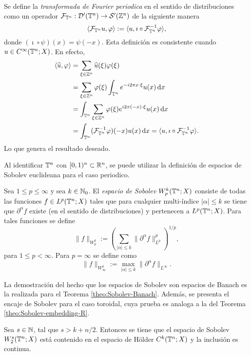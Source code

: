 \begin{definition}
	Se define la \textit{transformada de Fourier periodica} en el sentido de distribuciones como un operador $\mathcal{F}_{\mathbb{T}^n}:\mathcal{D}'(\mathbb{T}^n)\to\mathcal{S}'(\mathbb{Z}^n)$ de la siguiente manera
	\begin{equation*}
		\langle\mathcal{F}_{\mathbb{T}^n}u, \varphi\rangle := \langle u, \imath \circ \mathcal{F}_{\mathbb{T}^n}^{-1}\varphi\rangle,
	\end{equation*}
	donde $(\imath\circ\psi)(x) = \psi(-x)$. Esta definición es consistente cuando $u\in C^\infty(\mathbb{T}^n;X)$. En efecto, 
	\begin{align*}
		\langle\widehat{u}, \varphi\rangle &= \sum_{\xi\in\mathbb{Z}^n}\widehat{u}(\xi)\varphi(\xi)\\
		& = \sum_{\xi\in\mathbb{Z}^n} \varphi(\xi) \int_{\mathbb{T}^n}e^{-i2\pi x\cdot\xi}  u(x) \mathop{}\!\mathrm{d} x \\
		& =\int_{\mathbb{T}^n}  \sum_{\xi\in\mathbb{Z}^n} \varphi(\xi) e^{i2\pi (-x)\cdot\xi}u(x)\mathop{}\!\mathrm{d} x \\
		& = \int_{\mathbb{T}^n} (\mathcal{F}_{\mathbb{T}^n}^{-1}\varphi)(-x) u(x) \mathop{}\!\mathrm{d} x = \langle u, \imath\circ \mathcal{F}_{\mathbb{T}^n}^{-1}\varphi\rangle.
	\end{align*}
	Lo que genera el resultado deseado.
\end{definition}
Al identificar $\mathbb{T}^n$ con $[0,1)^n\subset\mathbb{R}^n$, se puede utilizar la definición de espacios de Sobolev euclideana para el caso periodico.
\begin{definition}
	Sea $1\leq p \leq\infty$ y sea $k\in\mathbb{N}_0$. El \textit{espacio de Sobolev} $W^k_p(\mathbb{T}^n;X)$ consiste de todas las funciones $f\in L^p(\mathbb{T}^n;X)$ tales que para cualquier multi-índice $|\alpha|\leq k$ se tiene que $\partial^\alpha f$ existe (en el sentido de distribuciones) y pertenecen a $L^p(\mathbb{T}^n;X)$. Para tales funciones se define 
	\begin{equation*}
		\|f\|_{W^k_p} := \left( \sum_{|\alpha|\leq k} \|\partial^\alpha f\|_{L^p}^p
		\right)^{1/p},
	\end{equation*}
	para $1\leq p <\infty$. Para $p=\infty$ se define como 
	\begin{equation*}
		\|f\|_{W^k_\infty} := \max_{|\alpha|\leq k} \|\partial^\alpha f\|_{L^\infty}.
	\end{equation*}
\end{definition}
La demostración del hecho que los espacios de Sobolev son espacios de Banach es la realizada para el Teorema \ref{theo:Sobolev-Banach}. Además, se presenta el encaje de Sobolev para el caso toroidal, cuya prueba es analoga a la del Teorema \ref{theo:Sobolev-embedding-R}.
\begin{theorem}\label{theo:Sobolev-embedding-T}
	Sea $s\in\mathbb{N}$, tal que $s>k+n/2$. Entonces se tiene que el espacio de Sobolev $W^s_2(\mathbb{T}^n;X)$ está contenido en el espacio de H\"older $C^k(\mathbb{T}^n;X)$ y la inclusión es continua.
\end{theorem}
